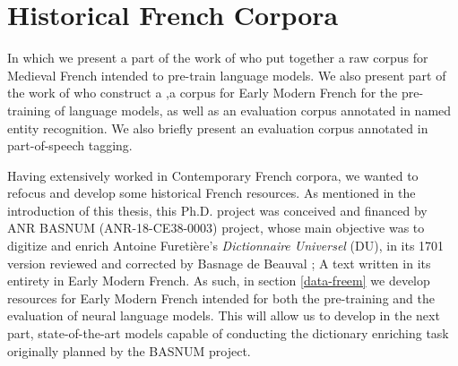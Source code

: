 \chapter{Historical French Corpora}\label{chap:historical}

\begin{center}
    \begin{minipage}{0.66\textwidth}
        \begin{small}
            In which we present a part of the work of \citet{grobol-etal-2022-bertrade} who put together a raw corpus for Medieval French intended to pre-train language models. We also present part of the work of \citet{gabay-etal-2022-from} who construct a \freemmax,a corpus for Early Modern French for the pre-training of language models, as well as \freemner an evaluation corpus annotated in named entity recognition. We also briefly present \freemlpm an evaluation corpus annotated in part-of-speech tagging.\footnotemark
        \end{small}
    \end{minipage}
    \vspace{0.5cm}
\end{center}


Having extensively worked in Contemporary French corpora, we wanted to refocus and develop some historical French resources. As mentioned in the introduction of this thesis, this Ph.D. project was conceived and financed by ANR BASNUM (ANR-18-CE38-0003) project, whose main objective was to digitize and enrich Antoine Furetière's \emph{Dictionnaire Universel} (DU), in its 1701 version reviewed and corrected by Basnage de Beauval \citep{furetiere-1701-dictionnaire}; A text written in its entirety in Early Modern French. As such, in section \ref{data-freem} we develop resources for Early Modern French intended for both the pre-training and the evaluation of neural language models. This will allow us to develop in the next part, state-of-the-art models capable of conducting the dictionary enriching task originally planned by the BASNUM project.

